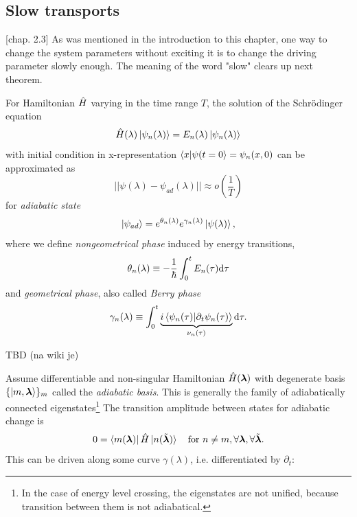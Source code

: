 \subsection{Slow transports}
\citep{kolodrubez}[chap. 2.3]
As was mentioned in the introduction to this chapter, one way to change the system parameters without exciting it is to change the driving parameter slowly enough. The meaning of the word "slow" clears up next theorem.
\begin{thm}
    \label{adiabaticTheorem}
    For Hamiltonian $\hat{H}$ varying in the time range $T$, the solution of the Schrödinger equation 
    $$\hat{H}(\lambda)\ket{\psi_n(\lambda)} = E_n(\lambda)\ket{\psi_n(\lambda)}$$
    with initial condition in x-representation $\braket{x|\psi(t=0}=\psi_n(x,0)$ can be approximated as
    \begin{equation}
      ||\psi(\lambda) - \psi_{ad}(\lambda)||\approx o\left(\frac{1}{T}\right)
    \end{equation}
    for \emph{adiabatic state}
    \begin{equation}
        \ket{\psi_{ad}}= e^{\theta_n(\lambda)}e^{\gamma_n(\lambda)}\ket{\psi(\lambda)},
    \end{equation}
    where we define \emph{nongeometrical phase} induced by energy transitions,
    $$\theta_n(\lambda)\equiv -\frac{1}{\hbar}\int_0^t E_n(\tau)\mathrm{d} \tau$$
    and \emph{geometrical phase}, also called \emph{Berry phase}
        $$\gamma_n(\lambda)\equiv \int_0^t \underbrace{i\braket{\psi_n(\tau)|\partial_t\psi_n(\tau)}}_{\nu_n(\tau)} \mathrm{d} \tau .$$
\end{thm}
\begin{myproof}
    TBD (na wiki je)
\end{myproof}
Assume differentiable and non-singular Hamiltonian $\hat{H}({\bm\lambda})$ with degenerate basis $\{\ket{m,{\bm\lambda}}\}_m$ called the \emph{adiabatic basis}. This is generally the family of adiabatically connected eigenstates\footnote{In the case of energy level crossing, the eigenstates are not unified, because transition between them is not adiabatical.} The transition amplitude between states for adiabatic change is
\begin{equation}
    0=\bra{m({\bm\lambda})}\hat{H}\ket{n(\tilde{{\bm\lambda}})} \quad \text{for }n\neq m, \forall {\bm\lambda},\forall \tilde {{\bm\lambda}}.
\end{equation}
This can be driven along some curve $\gamma(\lambda)$, i.e. differentiated by $\partial_t$:
